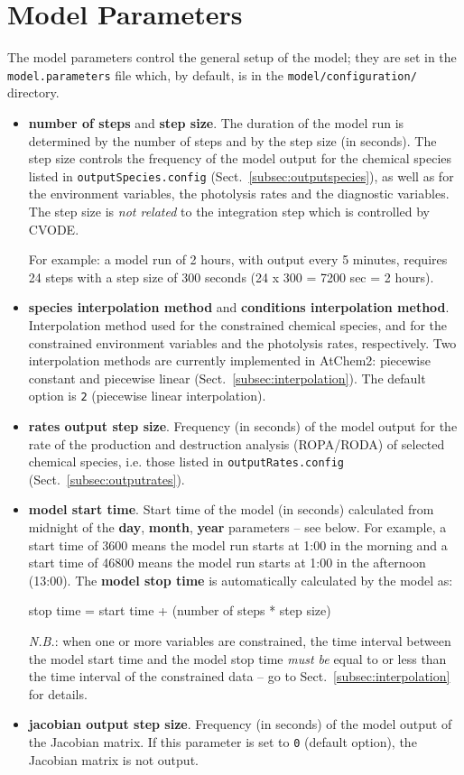 \section{Model Parameters} \label{sec:model-parameters}

The model parameters control the general setup of the model; they are
set in the \texttt{model.parameters} file which, by default, is
in the \texttt{model/configuration/} directory.

\begin{itemize}
\item \textbf{number of steps} and \textbf{step size}. The duration of
  the model run is determined by the number of steps and by the step
  size (in seconds). The step size controls the frequency of the model
  output for the chemical species listed in \texttt{outputSpecies.config}
  (Sect.~\ref{subsec:outputspecies}), as well as for the environment
  variables, the photolysis rates and the diagnostic variables. The
  step size is \emph{not related} to the integration step which is
  controlled by CVODE.

  For example: a model run of 2 hours, with output every 5 minutes,
  requires 24 steps with a step size of 300 seconds (24 x 300 = 7200
  sec = 2 hours).
\item \textbf{species interpolation method} and
  \textbf{conditions interpolation method}. Interpolation method used
  for the constrained chemical species, and for the constrained
  environment variables and the photolysis rates, respectively. Two
  interpolation methods are currently implemented in AtChem2:
  piecewise constant and piecewise linear (Sect.~\ref{subsec:interpolation}).
  The default option is \texttt{2} (piecewise linear interpolation).
\item \textbf{rates output step size}. Frequency (in seconds) of the
  model output for the rate of the production and destruction analysis
  (ROPA/RODA) of selected chemical species, i.e. those listed in
  \texttt{outputRates.config} (Sect.~\ref{subsec:outputrates}).
\item \textbf{model start time}. Start time of the model (in seconds)
  calculated from midnight of the \textbf{day}, \textbf{month},
  \textbf{year} parameters -- see below. For example, a start time of
  3600 means the model run starts at 1:00 in the morning and a start
  time of 46800 means the model run starts at 1:00 in the afternoon
  (13:00). The \textbf{model stop time} is automatically calculated by
  the model as:
  \begin{center}
  stop time = start time + (number of steps * step size)
  \end{center}
  \emph{N.B.}: when one or more variables are constrained, the time
  interval between the model start time and the model stop time
  \emph{must be} equal to or less than the time interval of the
  constrained data -- go to Sect.~\ref{subsec:interpolation} for details.
\item \textbf{jacobian output step size}. Frequency (in seconds) of
  the model output of the Jacobian matrix. If this parameter is set to
  \texttt{0} (default option), the Jacobian matrix is not output.


\end{itemize}
